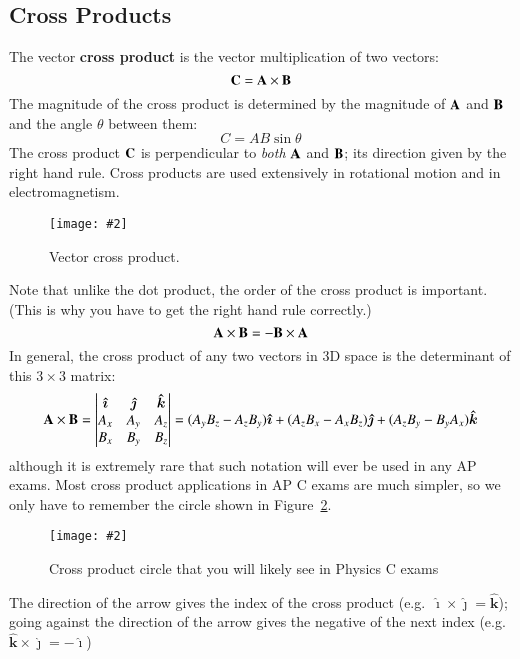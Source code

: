 \documentclass{../../../oss-handout}
\newcommand{\mb}[1]{\ensuremath\mathbf{#1}}
\newcommand{\pic}[2]{\texttt{[image: \#2]}}
\begin{document}
\subsection{Cross Products}
The vector \textbf{cross product} is the vector multiplication of two vectors:
\begin{equation*}
  \mb{C}=\mb{A}\times\mb{B}
\end{equation*}
The magnitude of the cross product is determined by the magnitude of $\mb{A}$
and $\mb{B}$ and the angle $\theta$ between them:
\begin{equation*}
  C=AB\sin\theta
\end{equation*}
The cross product $\mb{C}$ is perpendicular to \emph{both} $\mb{A}$ and
$\mb{B}$; its direction given by the right hand rule. Cross products are used
extensively in rotational motion and in electromagnetism.
\begin{figure}[ht]
  \centering
  \pic{.3}{cross-product.png}
  \caption{Vector cross product.}
  \label{fig:cross1}
\end{figure}
Note that unlike the dot product, the order of the cross product is important.
(This is why you have to get the right hand rule correctly.)
\begin{equation*}
  \mb{A}\times\mb{B}=-\mb{B}\times\mb{A}
\end{equation*}
In general, the cross product of any two vectors in 3D space is the determinant
of this $3\times 3$ matrix:
\begin{equation*}
  \mb{A}\times\mb{B}=
  \left|
  \begin{matrix}
    \bm{\hat{\imath}} & \bm{\hat{\jmath}} & \bm{\hat{k}}\\
    A_x & A_y & A_z\\
    B_x & B_y & B_z
  \end{matrix}
  \right|
  =(A_yB_z-A_zB_y)\bm{\hat{\imath}} +
  (A_zB_x-A_xB_z)\bm{\hat{\jmath}} +
  (A_zB_y-B_yA_x)\bm{\hat{k}}
\end{equation*}
although it is extremely rare that such notation will ever be used in any AP
exams. Most cross product applications in AP C exams are much simpler, so we
only have to remember the circle shown in Figure~\ref{fig:cross2}.
\begin{figure}[ht]
  \centering
  \pic{.12}{cross-product-circle.png}
  \caption{Cross product circle that you will likely see in Physics C exams}
  \label{fig:cross2}
\end{figure}

The direction of the arrow gives the index of the cross product (e.g.\
$\bm{\hat{\imath}}\times\bm{\hat{\jmath}}=\bm{\hat{k}}$); going against the
direction of the arrow gives the negative of the next index (e.g.\
$\bm{\hat{k}}\times\bm{\hat{\jmath}}=-\bm{\hat{\imath}}$)
\end{document}
